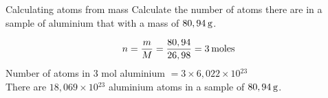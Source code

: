     \noindent
\label{m38717*secfhsst!!!underscore!!!id494}\vspace{-2cm} 
      \noindent
      \begin{wex}{Calculating atoms from mass }{
\label{m38717*probfhsst!!!underscore!!!id495}
      \label{m38717*id277914}Calculate the number of atoms there are in a sample of aluminium that with a mass of $80,94\phantom{\rule{2pt}{0ex}}\text{g}$.
      \vspace{5pt}}
{
      \label{m38717*id277959}\nopagebreak\noindent{}
        
    \begin{equation*}
    n=\frac{m}{M}=\frac{80,94}{26,98}=3\phantom{\rule{2pt}{0ex}}\text{moles}
      \end{equation*}
      \label{m38717*id278019}Number of atoms in 3 mol aluminium $=3\ensuremath{\times}6,022\ensuremath{\times}10{}^{23}$ \\
      \label{m38717*id278053}There are $18,069\ensuremath{\times}10{}^{23}$ aluminium atoms in a sample of $80,94\phantom{\rule{2pt}{0ex}}\text{g}$.
}
    \end{wex}
    \noindent
\label{m38717*secfhsst!!!underscore!!!id539}
